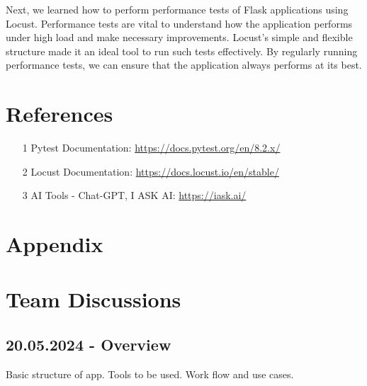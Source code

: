 Next, we learned how to perform performance tests of Flask applications using Locust. Performance tests are vital to understand how the application performs under high load and make necessary improvements. Locust's simple and flexible structure made it an ideal tool to run such tests effectively. By regularly running performance tests, we can ensure that the application always performs at its best.\newpage

\section{References}


        \begin{itemize}
        \item [1] Pytest Documentation: \url{https://docs.pytest.org/en/8.2.x/}
        \item [2] Locust Documentation: \url{https://docs.locust.io/en/stable/}
        \item [3] AI Tools - Chat-GPT, I ASK AI: \url{https://iask.ai/}
    \end{itemize}\newpage


\section{Appendix}


\section*{Team Discussions}

\subsection*{20.05.2024 - Overview}
\begin{itemize}
    Basic structure of app.\newline
    Tools to be used.\newline
    Work flow and use cases.\newline
\end{itemize}

